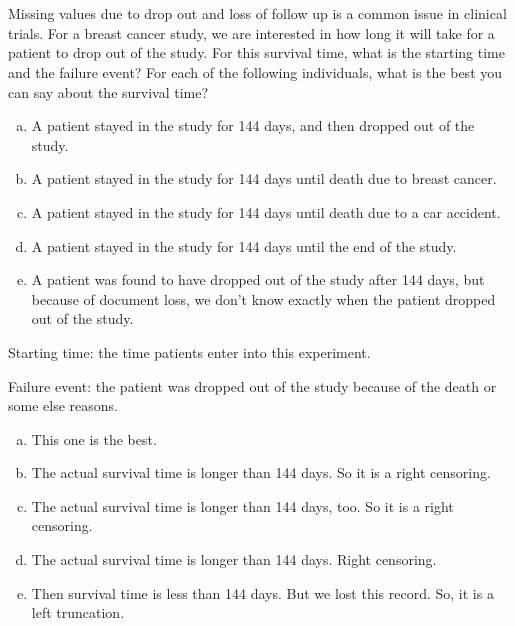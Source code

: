 \documentclass[12pt]{elegantbook}
\begin{document}

\chapter{}

    \begin{exercise}
        Missing values due to drop out and loss of follow up is a common issue in clinical trials. For a breast cancer study, we are interested in how long it will take for a patient to drop out of the study. For this survival time, what is the starting time and the failure event? For each of the following individuals, what is the best you can say about the survival time?
        \begin{enumerate}[(a)]
            \item A patient stayed in the study for 144 days, and then dropped out of the study.
            \item A patient stayed in the study for 144 days until death due to breast cancer.
            \item A patient stayed in the study for 144 days until death due to a car accident.
            \item A patient stayed in the study for 144 days until the end of the study.
            \item A patient was found to have dropped out of the study after 144 days, but because of document loss, we don't know exactly when the patient dropped out of the study. 
        \end{enumerate}
    \end{exercise}

    \begin{solution}

        Starting time: the time patients enter into this experiment. 

        Failure event: the patient was dropped out of the study because of the death or some else reasons. 
        \begin{enumerate}[(a)]
            \item This one is the best. 
            \item The actual survival time is longer than 144 days. So it is a right censoring. 
            \item The actual survival time is longer than 144 days, too. So it is a right censoring. 
            \item The actual survival time is longer than 144 days. Right censoring. 
            \item Then survival time is less than 144 days. But we lost this record. So, it is a left truncation. 
        \end{enumerate}
    \end{solution}
\end{document}
